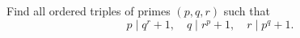 Find all ordered triples of primes $(p, q, r)$ such that \[ p \mid q^r + 1, \quad q \mid r^p + 1, \quad r \mid p^q + 1.  \]